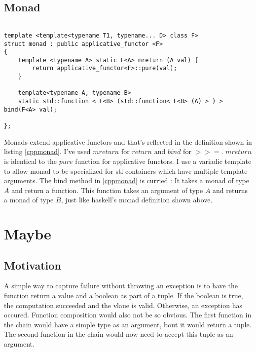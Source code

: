 \documentclass[12pt,fleqn]{article}
\begin{document}
%
%
%
\subsection{Monad}
%
%
%
\begin{minipage}{\linewidth}
\begin{lstlisting}[caption=monad defintion in C++, label=cppmonad]

template <template<typename T1, typename... D> class F> 
struct monad : public applicative_functor <F>
{
	template <typename A> static F<A> mreturn (A val) {
		return applicative_functor<F>::pure(val);
	}

	template<typename A, typename B>
	static std::function < F<B> (std::function< F<B> (A) > ) > bind(F<A> val);
	
};

\end{lstlisting}
\end{minipage}
%
%
%

Monads extend applicative functors and that's reflected in the definition shown in listing \ref{cppmonad}.
I've used $mreturn$ for $return$ and $bind$ for $>>=$.
$mreturn$ is identical to the $pure$ function for applicative functors.
I use a variadic template to allow monad to be specialized for stl containers which have multiple template arguments. 
The bind method in \ref{cppmonad} is curried : It takes a monad of type $A$ and return a function.
This function takes an argument of type $A$ and returns a monad of type $B$, just like haskell's monad definition shown above.

%
%
\section{Maybe}
%

%
\subsection{Motivation}
%
%

A simple way to capture failure without throwing an exception is to have the function return a value and a boolean as part of a tuple.
If the boolean is true, the computation succeeded and the vlaue is valid. Otherwise, an exception has occured.
Function composition would also not be so obvious. The first function in the chain would have a simple type as an argument, bout it would return a tuple.
The second function in the chain would now need to accept this tuple as an argument.
\end{document}
